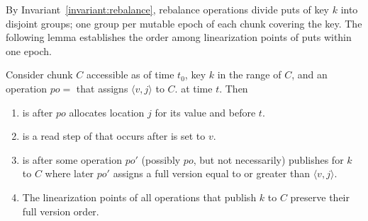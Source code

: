 By Invariant~\ref{invariant:rebalance},
rebalance operations divide puts of key $k$ into disjoint groups; one group per mutable epoch of each chunk covering the key.
The following lemma 
establishes the order among linearization points of puts within one epoch.
\begin{lemma}
\label{proof:put}
Consider chunk $C$ accessible as of time $t_0$, key $k$ in the range of $C$, and an
operation $po=$ that assigns $\langle v, j\rangle$ to $C$. at time $t$. Then  
\begin{enumerate}
\setlength{\itemsep}{0pt}
\setlength{\parskip}{0pt}
\item \label{proof:put:lp1}  is after $po$ allocates location $j$ for its value and before $t$.
\item \label{proof:put:lp2}  is a read step of  that occurs after  is set to $v$.
\item \label{proof:put:lp3}  is after some operation $po'$ (possibly $po$, but not necessarily) publishes for $k$ to $C$ where later $po'$ assigns a full version equal to or greater than $\langle v, j\rangle$.
\item \label{proof:put:lp4} The linearization points of all operations that publish $k$ to $C$ preserve their full version order.
\end{enumerate}
\end{lemma}
